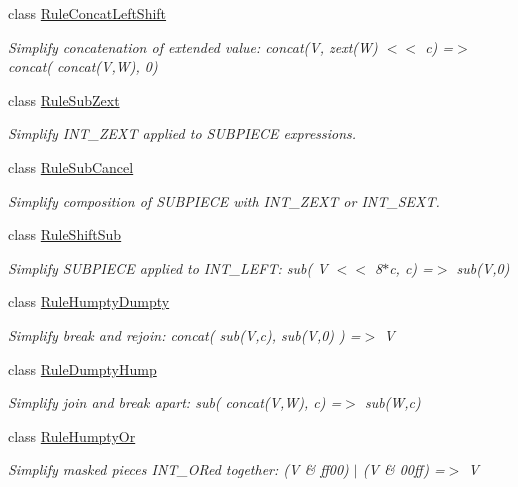 \begin{DoxyCompactItemize}
class \mbox{\hyperlink{class_rule_concat_left_shift}{Rule\+Concat\+Left\+Shift}}
\begin{DoxyCompactList}\small\item\em Simplify concatenation of extended value\+: {\ttfamily concat(V, zext(\+W) $<$$<$ c) =$>$ concat( concat(\+V,\+W), 0)} \end{DoxyCompactList}\item 
class \mbox{\hyperlink{class_rule_sub_zext}{Rule\+Sub\+Zext}}
\begin{DoxyCompactList}\small\item\em Simplify I\+N\+T\+\_\+\+Z\+E\+XT applied to S\+U\+B\+P\+I\+E\+CE expressions. \end{DoxyCompactList}\item 
class \mbox{\hyperlink{class_rule_sub_cancel}{Rule\+Sub\+Cancel}}
\begin{DoxyCompactList}\small\item\em Simplify composition of S\+U\+B\+P\+I\+E\+CE with I\+N\+T\+\_\+\+Z\+E\+XT or I\+N\+T\+\_\+\+S\+E\+XT. \end{DoxyCompactList}\item 
class \mbox{\hyperlink{class_rule_shift_sub}{Rule\+Shift\+Sub}}
\begin{DoxyCompactList}\small\item\em Simplify S\+U\+B\+P\+I\+E\+CE applied to I\+N\+T\+\_\+\+L\+E\+FT\+: {\ttfamily sub( V $<$$<$ 8$\ast$c, c) =$>$ sub(\+V,0)} \end{DoxyCompactList}\item 
class \mbox{\hyperlink{class_rule_humpty_dumpty}{Rule\+Humpty\+Dumpty}}
\begin{DoxyCompactList}\small\item\em Simplify break and rejoin\+: {\ttfamily concat( sub(\+V,c), sub(\+V,0) ) =$>$ V} \end{DoxyCompactList}\item 
class \mbox{\hyperlink{class_rule_dumpty_hump}{Rule\+Dumpty\+Hump}}
\begin{DoxyCompactList}\small\item\em Simplify join and break apart\+: {\ttfamily sub( concat(\+V,\+W), c) =$>$ sub(\+W,c)} \end{DoxyCompactList}\item 
class \mbox{\hyperlink{class_rule_humpty_or}{Rule\+Humpty\+Or}}
\begin{DoxyCompactList}\small\item\em Simplify masked pieces I\+N\+T\+\_\+\+O\+Red together\+: {\ttfamily (V \& ff00) $\vert$ (V \& 00ff) =$>$ V} \end{DoxyCompactList}\item 

\end{DoxyCompactItemize}
